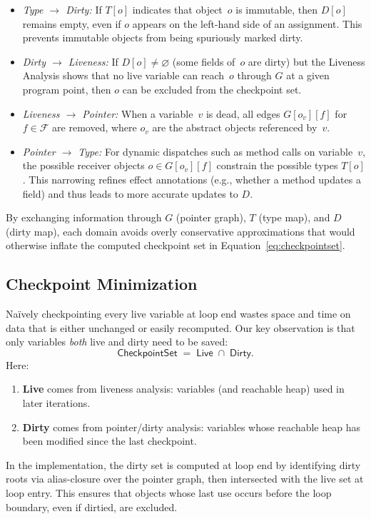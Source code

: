 \begin{itemize}
    \item \emph{Type $\rightarrow$ Dirty:}
    If $T[o]$ indicates that object~$o$ is immutable, then $D[o]$ remains empty, even if $o$ appears on the left-hand side of an assignment. This prevents immutable objects from being spuriously marked dirty.

    \item \emph{Dirty $\rightarrow$ Liveness:}
    If $D[o] \neq \varnothing$ (some fields of~$o$ are dirty) but the Liveness Analysis shows that no live variable can reach~$o$ through $G$ at a given program point, then $o$ can be excluded from the checkpoint set.

    \item \emph{Liveness $\rightarrow$ Pointer:}
    When a variable~$v$ is dead, all edges $G[o_v][f]$ for $f \in \mathcal{F}$ are removed, where $o_v$ are the abstract objects referenced by~$v$.

    \item \emph{Pointer $\rightarrow$ Type:}
    For dynamic dispatches such as method calls on variable~$v$, the possible receiver objects $o \in G[o_v][f]$ constrain the possible types $T[o]$.
    This narrowing refines effect annotations (e.g., whether a method updates a field) and thus leads to more accurate updates to $D$.
\end{itemize}

By exchanging information through $G$ (pointer graph), $T$ (type map), and $D$ (dirty map),
each domain avoids overly conservative approximations that would otherwise inflate
the computed checkpoint set in Equation~\eqref{eq:checkpointset}.

\subsection{Checkpoint Minimization}
Naïvely checkpointing every live variable at loop end wastes space and time on data
that is either unchanged or easily recomputed. Our key observation is that only
variables \emph{both} live and dirty need to be saved:
\begin{equation}
    \label{eq:checkpointset}
    \mathsf{CheckpointSet} \;=\; \mathsf{Live} \;\cap\; \mathsf{Dirty}.
\end{equation}
Here:
\begin{enumerate}
    \item \textbf{Live} comes from liveness analysis: variables (and reachable heap)
    used in later iterations.
    \item \textbf{Dirty} comes from pointer/dirty analysis: variables whose reachable heap
    has been modified since the last checkpoint.
\end{enumerate}
In the implementation, the dirty set is computed at loop end by identifying dirty roots
via alias-closure over the pointer graph, then intersected with the live set at loop entry.
This ensures that objects whose last use occurs before the loop boundary, even if dirtied,
are excluded.

